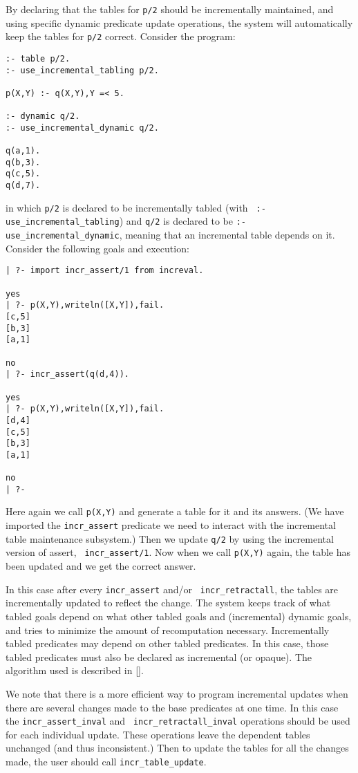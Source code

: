 By declaring that the tables for {\tt p/2} should be incrementally
maintained, and using specific dynamic predicate update operations,
the system will automatically keep the tables for {\tt p/2} correct.
Consider the program:
\begin{verbatim}
:- table p/2.
:- use_incremental_tabling p/2.

p(X,Y) :- q(X,Y),Y =< 5.

:- dynamic q/2.
:- use_incremental_dynamic q/2.

q(a,1).
q(b,3).
q(c,5).
q(d,7).
\end{verbatim}
in which {\tt p/2} is declared to be incrementally tabled (with {\tt
:- use\_incremental\_tabling}) and {\tt q/2} is declared to be {\tt :-
use\_incremental\_dynamic}, meaning that an incremental table depends on
it.  Consider the following goals and execution:
\begin{verbatim}
| ?- import incr_assert/1 from increval.

yes
| ?- p(X,Y),writeln([X,Y]),fail.
[c,5]
[b,3]
[a,1]

no
| ?- incr_assert(q(d,4)).

yes
| ?- p(X,Y),writeln([X,Y]),fail.
[d,4]
[c,5]
[b,3]
[a,1]

no
| ?- 
\end{verbatim}
Here again we call {\tt p(X,Y)} and generate a table for it and its
answers.  (We have imported the {\tt incr\_assert} predicate we need
to interact with the incremental table maintenance subsystem.)  Then
we update {\tt q/2} by using the incremental version of assert, {\tt
incr\_assert/1}.  Now when we call {\tt p(X,Y)} again, the table has
been updated and we get the correct answer.

In this case after every {\tt incr\_assert} and/or {\tt
incr\_retractall}, the tables are incrementally updated to reflect the
change.  The system keeps track of what tabled goals depend on what
other tabled goals and (incremental) dynamic goals, and tries to
minimize the amount of recomputation necessary.  Incrementally tabled
predicates may depend on other tabled predicates.  In this case, those
tabled predicates must also be declared as incremental (or opaque).
The algorithm used is described in [].

We note that there is a more efficient way to program incremental
updates when there are several changes made to the base predicates at
one time.  In this case the {\tt incr\_assert\_inval} and {\tt
incr\_retractall\_inval} operations should be used for each individual
update.  These operations leave the dependent tables unchanged (and
thus inconsistent.)  Then to update the tables for all the changes
made, the user should call {\tt incr\_table\_update}.



